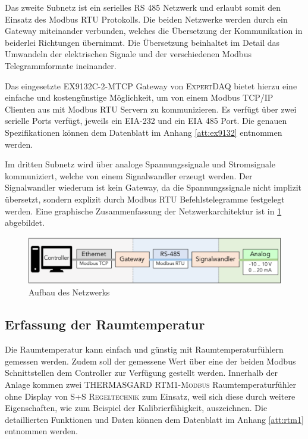 Das zweite Subnetz ist ein serielles RS 485 Netzwerk und erlaubt somit den Einsatz des Modbus RTU Protokolls. Die beiden Netzwerke werden durch ein Gateway miteinander verbunden, welches die Übersetzung der Kommunikation in beiderlei Richtungen übernimmt. Die Übersetzung beinhaltet im Detail das Umwandeln der elektrischen Signale und der verschiedenen Modbus Telegrammformate ineinander.

Das eingesetzte \textsc{EX9132C-2-MTCP} Gateway von \textsc{ExpertDAQ} bietet hierzu eine einfache und kostengünstige Möglichkeit, um von einem Modbus TCP/IP Clienten aus mit Modbus RTU Servern zu kommunizieren. Es verfügt über zwei serielle Ports verfügt, jeweils ein EIA-232 und ein EIA 485 Port. Die genauen Spezifikationen können dem Datenblatt im Anhang \ref{att:ex9132} entnommen werden.

Im dritten Subnetz wird über analoge Spannungssignale und Stromsignale kommuniziert, welche von einem Signalwandler erzeugt werden. Der Signalwandler wiederum ist kein Gateway, da die Spannungssignale nicht implizit übersetzt, sondern explizit durch Modbus RTU Befehlstelegramme festgelegt werden. Eine graphische Zusammenfassung der Netzwerkarchitektur ist in \ref{fig:netzwerk} abgebildet.

\begin{figure}
\centering
\includegraphics[width=\textwidth]{abbildungen/20160324_netzwerk}
\caption{Aufbau des Netzwerks}
\label{fig:netzwerk}
\end{figure}

\subsection{Erfassung der Raumtemperatur}

Die Raumtemperatur kann einfach und günstig mit Raumtemperaturfühlern gemessen werden. Zudem soll der gemessene Wert über eine der beiden Modbus Schnittstellen dem Controller zur Verfügung gestellt werden. Innerhalb der Anlage kommen zwei \textsc{THERMASGARD RTM1-Modbus} Raumtemperaturfühler ohne Display von \textsc{S+S Regeltechnik} zum Einsatz, weil sich diese durch weitere Eigenschaften, wie zum Beispiel der Kalibrierfähigkeit, auszeichnen. Die detaillierten Funktionen und Daten können dem Datenblatt im Anhang \ref{att:rtm1} entnommen werden.

